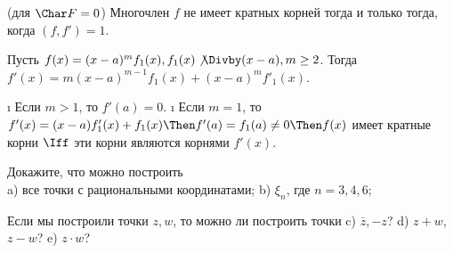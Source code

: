 \begin{problem}[37 (9.2)]
(для $\Char F = 0$) Многочлен $f$ не имеет кратных корней тогда и только тогда, когда $(f,f')=1$.
\end{problem}

\begin{solution}
Пусть \(f(x) = (x-a)^mf_1(x), f_1(x) \not\Divby (x-a), m \ge 2\). Тогда \(f'(x)=m(x-a)^{m-1}f_1(x)+(x-a)^mf'_1(x)\).

\begin{itemize}
\tightlist
\i
  Если \(m>1\), то \(f'(a) = 0\).
\i
  Если \(m=1\), то \(f'(x)=(x-a)f'_1(x)+f_1(x) \Then f'(a)=f_1(a) \ne 0 \Then f(x)\) имеет кратные корни \(\Iff\) эти корни являются корнями \(f'(x)\).
\end{itemize}

\end{solution}

\begin{problem}[38(9.6)]
Докажите, что можно построить\\ 
a) все точки с рациональными координатами;
b) $\xi_n$, где $n=3,4,6$;

Если мы построили точки $z,w$, то можно ли построить точки 
c) $\overline{z},-z$? 
d) $z+w$, $z-w$?
e) $z\cdot w$?
\end{problem}

